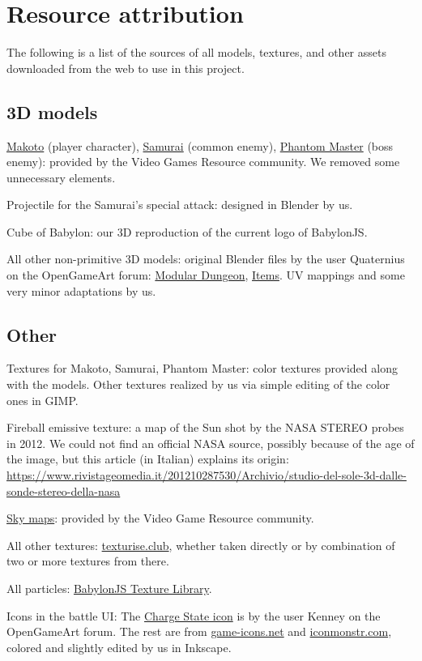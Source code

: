
\chapter*{Resource attribution}

The following is a list of the sources of all models, textures, and other assets downloaded from the web to use in this project.

\section*{3D models}

\href{https://www.models-resource.com/3ds/personaqshadowofthelabyrinth/model/14509/}{Makoto} (player character), \href{https://www.models-resource.com/3ds/personaqshadowofthelabyrinth/model/14582/}{Samurai} (common enemy), \href{https://www.models-resource.com/3ds/personaqshadowofthelabyrinth/model/14564/}{Phantom Master} (boss enemy): provided by the Video Games Resource community. We removed some unnecessary elements.

Projectile for the Samurai's special attack: designed in Blender by us.

Cube of Babylon: our 3D reproduction of the current logo of BabylonJS.

All other non-primitive 3D models: original Blender files by the user Quaternius on the OpenGameArt forum: \href{https://opengameart.org/content/lowpoly-modular-dungeon-pack}{Modular Dungeon}, \href{https://opengameart.org/content/low-poly-rpg-pack}{Items}. UV mappings and some very minor adaptations by us.

\section*{Other}

Textures for Makoto, Samurai, Phantom Master: color textures provided along with the models. Other textures realized by us via simple editing of the color ones in GIMP.

Fireball emissive texture: a map of the Sun shot by the NASA STEREO probes in 2012. We could not find an official NASA source, possibly because of the age of the image, but this article (in Italian) explains its origin: \url{https://www.rivistageomedia.it/201210287530/Archivio/studio-del-sole-3d-dalle-sonde-stereo-della-nasa}

\href{https://www.textures-resource.com/nintendo_switch/mariokart8deluxe/texture/14725/}{Sky maps}: provided by the Video Game Resource community.

All other textures: \href{http://www.texturise.club/}{texturise.club}, whether taken directly or by combination of two or more textures from there.

All particles: \href{https://doc.babylonjs.com/toolsAndResources/assetLibraries/availableTextures}{BabylonJS Texture Library}.

Icons in the battle UI: The \href{https://opengameart.org/content/ui-pack-space-extension}{Charge State icon} is by the user Kenney on the OpenGameArt forum. The rest are from \href{https://game-icons.net/}{game-icons.net} and \href{https://iconmonstr.com/}{iconmonstr.com}, colored and slightly edited by us in Inkscape.